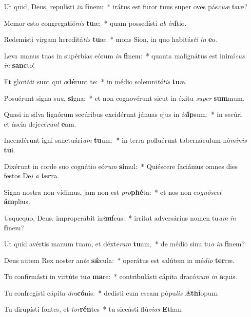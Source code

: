 \item Ut quid, Deus, repulísti \textit{in} \textbf{fi}nem:~* irátus est furor tuus super oves pás\textit{cu}\textit{æ} \textbf{tu}æ?
\item Memor esto congregatió\textit{nis} \textbf{tu}æ:~* quam possedísti \textit{ab} \textit{in}\textbf{í}tio.
\item Redemísti virgam hereditá\textit{tis} \textbf{tu}æ:~* mons Sion, in quo habitás\textit{ti} \textit{in} \textbf{e}o.
\item Leva manus tuas in supérbias eórum \textit{in} \textbf{fi}nem:~* quanta malignátus est inimí\textit{cus} \textit{in} \textbf{sanc}to!
\item Et gloriáti sunt qui \textit{o}\textbf{dé}runt te:~* in médio solemni\textit{tá}\textit{tis} \textbf{tu}æ.
\item Posuérunt signa su\textit{a}, \textbf{si}gna:~* et non cognovérunt sicut in éxitu \textit{su}\textit{per} \textbf{sum}mum.
\item Quasi in silva lignórum secúribus excidérunt jánuas ejus in \textit{id}\textbf{íp}sum:~* in secúri et áscia deje\textit{cé}\textit{runt} \textbf{e}am.
\item Incendérunt igni sanctuári\textit{um} \textbf{tu}um:~* in terra polluérunt tabernáculum nó\textit{mi}\textit{nis} \textbf{tu}i.
\item Dixérunt in corde suo cognátio eó\textit{rum} \textbf{si}mul:~* Quiéscere faciámus omnes dies festos De\textit{i} \textit{a} \textbf{ter}ra.
\item Signa nostra non vídimus, jam non est \textit{pro}\textbf{phé}ta:~* et nos non co\textit{gnó}\textit{scet} \textbf{ám}plius.
\item Usquequo, Deus, improperábit in\textit{i}\textbf{mí}cus:~* irrítat adversárius nomen tu\textit{um} \textit{in} \textbf{fi}nem?
\item Ut quid avértis manum tuam, et déxte\textit{ram} \textbf{tu}am,~* de médio sinu tu\textit{o} \textit{in} \textbf{fi}nem?
\item Deus autem Rex noster an\textit{te} \textbf{sǽ}cula:~* operátus est salútem in mé\textit{di}\textit{o} \textbf{ter}ræ.
\item Tu confirmásti in virtúte tu\textit{a} \textbf{ma}re:~* contribulásti cápita dracó\textit{num} \textit{in} \textbf{a}quis.
\item Tu confregísti cápita \textit{dra}\textbf{có}nis:~* dedísti eum escam pópu\textit{lis} \textit{Æ}\textbf{thí}opum.
\item Tu dirupísti fontes, et \textit{tor}\textbf{rén}tes~* tu siccásti flú\textit{vi}\textit{os} \textbf{E}than.
